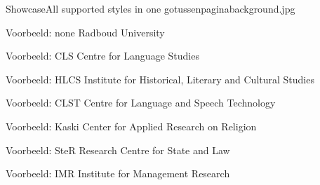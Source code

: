 \documentclass[department=softwarescience, notes={show notes}, slidesperpage=4, handout, official=true]{beamerruhuisstijl}
\begin{document}

\begin{tussenpagina}{Showcase}{All supported styles in one go}{tussenpaginabackground.jpg}
\end{tussenpagina}
\note{}

\renewcommand{\dept}{none}
\begin{frame}
    \titlepage
\end{frame}
\begin{frame}{Voorbeeld: none}
	Radboud University
\end{frame}

\renewcommand{\dept}{cls}
\begin{frame}
    \titlepage
\end{frame}
\begin{frame}{Voorbeeld: CLS}
	Centre for Language Studies
\end{frame}

\renewcommand{\dept}{hlcs}
\begin{frame}
    \titlepage
\end{frame}
\begin{frame}{Voorbeeld: HLCS}
	Institute for Historical, Literary and Cultural Studies
\end{frame}

\renewcommand{\dept}{clst}
\begin{frame}
    \titlepage
\end{frame}
\begin{frame}{Voorbeeld: CLST}
	Centre for Language and Speech Technology
\end{frame}

\renewcommand{\dept}{kaski}
\begin{frame}
    \titlepage
\end{frame}
\begin{frame}{Voorbeeld: Kaski}
	Center for Applied Research on Religion
\end{frame}

\renewcommand{\dept}{ster}
\begin{frame}
    \titlepage
\end{frame}
\begin{frame}{Voorbeeld: SteR}
	Research Centre for State and Law
\end{frame}

\renewcommand{\dept}{imr}
\begin{frame}
    \titlepage
\end{frame}
\begin{frame}{Voorbeeld: IMR}
	Institute for Management Research
\end{frame}
\end{document}
